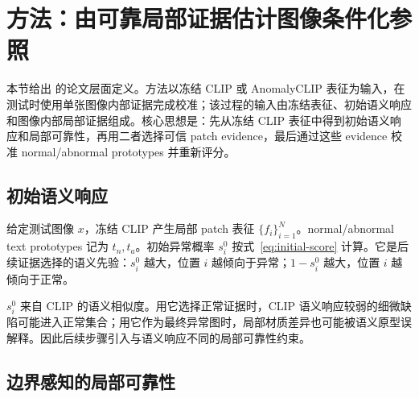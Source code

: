 \section{方法：由可靠局部证据估计图像条件化参照}
\label{sec:method}

本节给出 \method{} 的论文层面定义。方法以冻结 CLIP 或 AnomalyCLIP 表征为输入，在测试时使用单张图像内部证据完成校准；该过程的输入由冻结表征、初始语义响应和图像内部局部证据组成。核心思想是：先从冻结 CLIP 表征中得到初始语义响应和局部可靠性，再用二者选择可信 patch evidence，最后通过这些 evidence 校准 normal/abnormal prototypes 并重新评分。

\subsection{初始语义响应}

给定测试图像 $x$，冻结 CLIP 产生局部 patch 表征 $\{f_i\}_{i=1}^{N}$。normal/abnormal text prototypes 记为 $t_n,t_a$。初始异常概率 $s_i^0$ 按式~\eqref{eq:initial-score} 计算。它是后续证据选择的语义先验：$s_i^0$ 越大，位置 $i$ 越倾向于异常；$1-s_i^0$ 越大，位置 $i$ 越倾向于正常。

$s_i^0$ 来自 CLIP 的语义相似度。用它选择正常证据时，CLIP 语义响应较弱的细微缺陷可能进入正常集合；用它作为最终异常图时，局部材质差异也可能被语义原型误解释。因此后续步骤引入与语义响应不同的局部可靠性约束。

\subsection{边界感知的局部可靠性}

